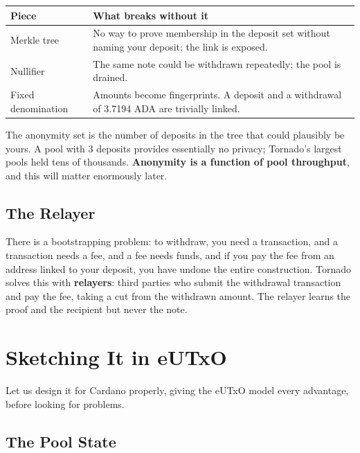 \begin{center}
\begin{tabular}{lp{7.6cm}}
  \hline
  \textbf{Piece} & \textbf{What breaks without it} \\
  \hline
  Merkle tree        & No way to prove membership in the deposit set without
                       naming your deposit; the link is exposed. \\
  \addlinespace
  Nullifier          & The same note could be withdrawn repeatedly; the pool is
                       drained. \\
  \addlinespace
  Fixed denomination & Amounts become fingerprints. A deposit and a
                       withdrawal of 3.7194 ADA are trivially linked. \\
  \hline
\end{tabular}
\end{center}

The anonymity set is the number of deposits in the tree that could plausibly be
yours. A pool with 3 deposits provides essentially no privacy; Tornado's largest
pools held tens of thousands. \textbf{Anonymity is a function of pool
throughput}, and this will matter enormously later.

\subsection*{The Relayer}

There is a bootstrapping problem: to withdraw, you need a transaction, and a
transaction needs a fee, and a fee needs funds, and if you pay the fee from an
address linked to your deposit, you have undone the entire construction. Tornado
solves this with \textbf{relayers}: third parties who submit the withdrawal
transaction and pay the fee, taking a cut from the withdrawn amount. The relayer
learns the proof and the recipient but never the note.

\section{Sketching It in eUTxO} \label{sec:ch8-sketch}

Let us design it for Cardano properly, giving the eUTxO model every advantage,
before looking for problems.

\subsection*{The Pool State}

